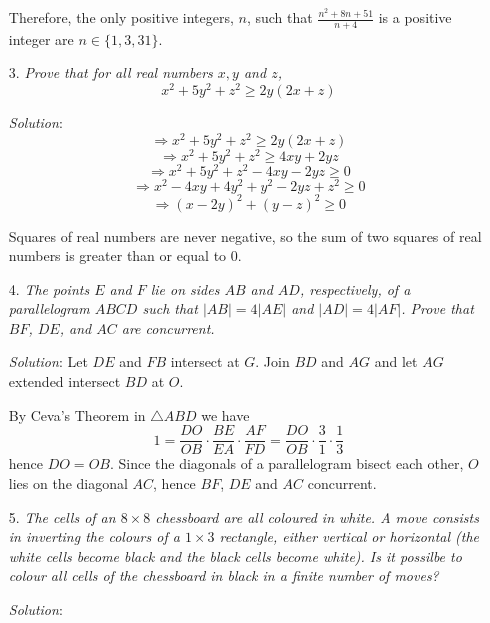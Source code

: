 \documentclass{article}
\begin{document}
\begin{enumerate}[1.]
Therefore, the only positive integers, $n$, such that $\frac{n^2 + 8n + 51}{n + 4}$ is a positive integer are $n \in \{1, 3, 31\}.$

\vspace{6.81mm}

\item[3.] %
\textit{Prove that for all real numbers $x, y$ and $z$,
$$x^2 + 5y^2 + z^2 \ge 2y(2x + z)$$}

\textit{Solution}:
$$\Rightarrow x^2 + 5y^2 + z^2 \ge 2y(2x + z)$$
$$\Rightarrow x^2 + 5y^2 + z^2 \ge 4xy + 2yz$$
$$\Rightarrow x^2 + 5y^2 + z^2 - 4xy - 2yz \ge 0$$
$$\Rightarrow x^2 - 4xy + 4y^2 + y^2 - 2yz + z^2 \ge 0$$
$$\Rightarrow (x - 2y)^2 + (y - z)^2 \ge 0$$

Squares of real numbers are never negative, so the sum of two squares of real numbers is greater than or equal to 0.\\

\vspace{6.81mm}

\item[4.] %
\textit{The points $E$ and $F$ lie on sides $AB$ and $AD$, respectively, of a parallelogram $ABCD$ such that $|AB| = 4|AE|$ and $|AD| = 4|AF|$.
Prove that $BF$, $DE$, and $AC$ are concurrent.}

\textit{Solution}:
Let $DE$ and $FB$ intersect at $G$. Join $BD$ and $AG$ and let $AG$ extended intersect $BD$ at $O$.

By Ceva's Theorem in $\triangle ABD$ we have
$$1 = \frac{DO}{OB} \cdot \frac{BE}{EA} \cdot \frac{AF}{FD} = \frac{DO}{OB} \cdot \frac{3}{1} \cdot \frac{1}{3}$$
hence $DO = OB$. Since the diagonals of a parallelogram bisect each other, $O$ lies on the diagonal $AC$, hence $BF$, $DE$ and $AC$ concurrent.
\vspace{6.81mm}

\item[5.] %
\textit{The cells of an $8 \times 8$ chessboard are all coloured in white. A move consists in inverting the colours of a $1 \times 3$ rectangle, either vertical or horizontal (the white cells become black and the black cells become white).
Is it possilbe to colour all cells of the chessboard in black in a finite number of moves?}

\textit{Solution}: 


\end{enumerate}
\end{document}
